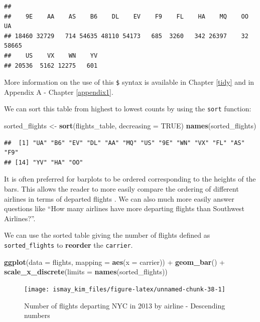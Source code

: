 \documentclass[]{tufte-book}
\newenvironment{Shaded}{\begin{snugshade}}{\end{snugshade}}
\newcommand{\KeywordTok}[1]{\textcolor[rgb]{0.13,0.29,0.53}{\textbf{{#1}}}}
\newcommand{\DataTypeTok}[1]{\textcolor[rgb]{0.13,0.29,0.53}{{#1}}}
\newcommand{\StringTok}[1]{\textcolor[rgb]{0.31,0.60,0.02}{{#1}}}
\newcommand{\OtherTok}[1]{\textcolor[rgb]{0.56,0.35,0.01}{{#1}}}
\newcommand{\NormalTok}[1]{{#1}}
\begin{document}
\begin{verbatim}
## 
##    9E    AA    AS    B6    DL    EV    F9    FL    HA    MQ    OO    UA 
## 18460 32729   714 54635 48110 54173   685  3260   342 26397    32 58665 
##    US    VX    WN    YV 
## 20536  5162 12275   601
\end{verbatim}

More information on the use of this \texttt{\$} syntax is available in
Chapter \ref{tidy} and in Appendix A - Chapter \ref{appendix1}.

We can sort this table from highest to lowest counts by using the
\texttt{sort} function:

\begin{Shaded}
\begin{Highlighting}[]
\NormalTok{sorted_flights <-}\StringTok{ }\KeywordTok{sort}\NormalTok{(flights_table, }\DataTypeTok{decreasing =} \OtherTok{TRUE}\NormalTok{)}
\KeywordTok{names}\NormalTok{(sorted_flights)}
\end{Highlighting}
\end{Shaded}

\begin{verbatim}
##  [1] "UA" "B6" "EV" "DL" "AA" "MQ" "US" "9E" "WN" "VX" "FL" "AS" "F9"
## [14] "YV" "HA" "OO"
\end{verbatim}

It is often preferred for barplots to be ordered corresponding to the
heights of the bars. This allows the reader to more easily compare the
ordering of different airlines in terms of departed flights
\citep{robbins2013}. We can also much more easily answer questions like
``How many airlines have more departing flights than Southwest
Airlines?''.

We can use the sorted table giving the number of flights defined as
\texttt{sorted\_flights} to \textbf{reorder} the \texttt{carrier}.

\begin{Shaded}
\begin{Highlighting}[]
\KeywordTok{ggplot}\NormalTok{(}\DataTypeTok{data =} \NormalTok{flights, }\DataTypeTok{mapping =} \KeywordTok{aes}\NormalTok{(}\DataTypeTok{x =} \NormalTok{carrier)) +}
\StringTok{  }\KeywordTok{geom_bar}\NormalTok{() +}
\StringTok{  }\KeywordTok{scale_x_discrete}\NormalTok{(}\DataTypeTok{limits =} \KeywordTok{names}\NormalTok{(sorted_flights))}
\end{Highlighting}
\end{Shaded}

\begin{figure}
\texttt{[image: ismay\_kim\_files/figure-latex/unnamed-chunk-38-1]} \caption[Number of flights departing NYC in 2013 by airline - Descending numbers]{Number of flights departing NYC in 2013 by airline - Descending numbers}\label{fig:unnamed-chunk-38}
\end{figure}
\end{document}

